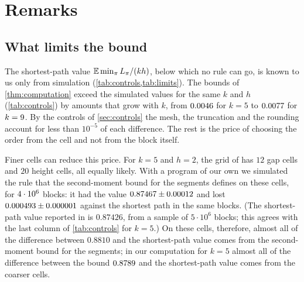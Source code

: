 \section{Remarks}\label{sec:remarks}

\subsection{What limits the bound}

The shortest-path value $\E\min_\pi L_\pi/(kh)$, below which no rule can go, is known to us only from simulation (\cref{tab:controls,tab:limits}). The bounds of \cref{thm:computation} exceed the simulated values for the same $k$ and $h$ (\cref{tab:controls}) by amounts that grow with $k$, from $0.0046$ for $k=5$ to $0.0077$ for $k=9$. By the controls of \cref{sec:controls} the mesh, the truncation and the rounding account for less than $10^{-5}$ of each difference. The rest is the price of choosing the order from the cell and not from the block itself.

Finer cells can reduce this price. For $k=5$ and $h=2$, the grid of \cite{DongCao2026} has $12$ gap cells and $20$ height cells, all equally likely. With a program of our own we simulated the rule that the second-moment bound for the segments defines on these cells, for $4\cdot10^{6}$ blocks: it had the value $0.87467\pm0.00012$ and lost $0.000493\pm0.000001$ against the shortest path in the same blocks. (The shortest-path value reported in \cite{DongCao2026} is $0.87426$, from a sample of $5\cdot10^6$ blocks; this agrees with the last column of \cref{tab:controls} for $k=5$.) On these cells, therefore, almost all of the difference between $0.8810$ and the shortest-path value comes from the second-moment bound for the segments; in our computation for $k=5$ almost all of the difference between the bound $0.8789$ and the shortest-path value comes from the coarser cells.

\begin{table}[ht]
\centering
\caption{Simulated shortest-path values $\E\min_\pi L_\pi/(kh)$: the smallest bound that \cref{thm:block} can give for blocks with $k$ gaps and strips of height $h$. For each $k$ the table gives the strip height with the smallest value among the multiples of $1/10$ that we tried, and that value, estimated from $\LimitSamples$ blocks (the same blocks at all strip heights) with a standard error of at most $\LimitError$.}
\label{tab:limits}

\end{table}

